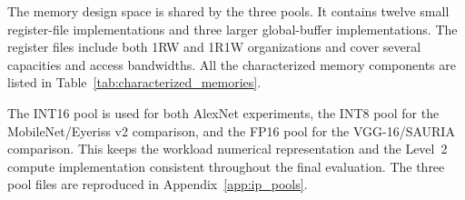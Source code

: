 
The memory design space is shared by the three pools. It contains
twelve small register-file implementations and three larger
global-buffer implementations. The register files include both 1RW
and 1R1W organizations and cover several capacities and access
bandwidths. All the characterized memory components are listed in
Table~\ref{tab:characterized_memories}.

The INT16 pool is used for both AlexNet experiments, the INT8 pool
for the MobileNet/Eyeriss v2 comparison, and the FP16 pool for the
VGG-16/SAURIA comparison. This keeps the workload numerical
representation and the Level~2 compute implementation consistent
throughout the final evaluation. The three pool files are reproduced
in Appendix~\ref{app:ip_pools}.

